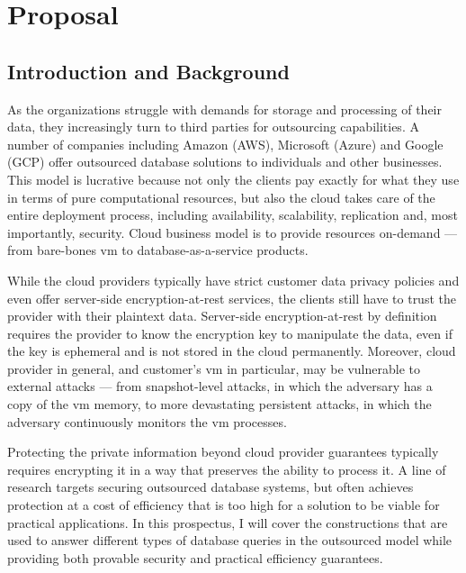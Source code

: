 
\chapter{Proposal}
\thispagestyle{myheadings}

	\section{Introduction and Background}

		As the organizations struggle with demands for storage and processing of their data, they increasingly turn to third parties for outsourcing capabilities.
		A number of companies including Amazon (AWS), Microsoft (Azure) and Google (GCP) offer outsourced database solutions to individuals and other businesses.
		This model is lucrative because not only the clients pay exactly for what they use in terms of pure computational resources, but also the cloud takes care of the entire deployment process, including availability, scalability, replication and, most importantly, security.
		Cloud business model is to provide resources on-demand --- from bare-bones \acrshort{vm} to database-as-a-service products.

		While the cloud providers typically have strict customer data privacy policies and even offer server-side encryption-at-rest services, the clients still have to trust the provider with their plaintext data.
		Server-side encryption-at-rest by definition requires the provider to know the encryption key to manipulate the data, even if the key is ephemeral and is not stored in the cloud permanently.
		Moreover, cloud provider in general, and customer's \acrshort{vm} in particular, may be vulnerable to external attacks --- from snapshot-level attacks, in which the adversary has a copy of the \acrshort{vm} memory, to more devastating persistent attacks, in which the adversary continuously monitors the \acrshort{vm} processes.

		Protecting the private information beyond cloud provider guarantees typically requires encrypting it in a way that preserves the ability to process it.
		A line of research targets securing outsourced database systems, but often achieves protection at a cost of efficiency that is too high for a solution to be viable for practical applications.
		In this prospectus, I will cover the constructions that are used to answer different types of database queries in the outsourced model while providing both provable security and practical efficiency guarantees.

